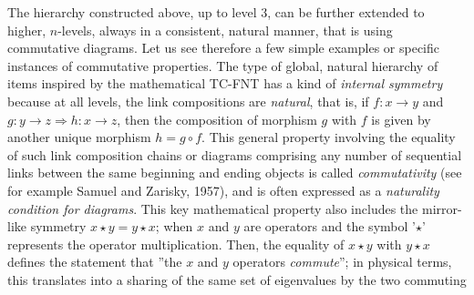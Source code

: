\documentclass[12pt]{article}
\theoremstyle{plain}
\theoremstyle{definition}
\theoremstyle{plain}
\numberwithin{equation}{section}
\newcommand{\lra}{{\longrightarrow}}
\begin{document}
 The hierarchy constructed above, up to level 3, can be
further extended to higher, $n$-levels, always in a consistent,
natural manner, that is using commutative diagrams. Let us see
therefore a few simple examples or specific instances of
commutative properties. The type of global, natural hierarchy of
items inspired by the mathematical TC-FNT has a kind of
\emph{internal symmetry} because at all levels, the link
compositions are \emph{natural}, that is, if $f: x \lra y$ and $g: y \lra z
\Longrightarrow h: x \lra z$, then the composition of morphism $g$ with $f$ is
given by another unique morphism  $h = g \circ f$. This general property involving the equality of such link composition chains or diagrams comprising any number of sequential links between the same beginning and ending objects is called \emph{commutativity} (see for example Samuel and Zarisky, 1957), and is often expressed as a \emph{naturality condition for diagrams}. This key mathematical property also includes the mirror-like symmetry $x\star y = y\star x$; when $x$ and $y$ are operators and the symbol '$\star$' represents the
operator multiplication. Then, the equality of $x\star y$ with
$y\star x$ defines the statement that ''the $x$ and $y$ 
operators \emph{commute}''; in physical terms, this translates
into a sharing of the same set of eigenvalues by the two commuting
\end{document}
